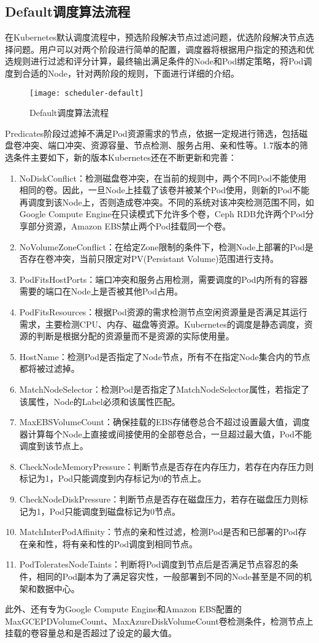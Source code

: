 \subsection{Default调度算法流程}
在Kubernetes默认调度流程中，预选阶段解决节点过滤问题，优选阶段解决节点选择问题。用户可以对两个阶段进行简单的配置，调度器将根据用户指定的预选和优选规则进行过滤和评分计算，最终输出满足条件的Node和Pod绑定策略，将Pod调度到合适的Node，针对两阶段的规则，下面进行详细的介绍。
\begin{figure}[H] %
	\centering
	\texttt{[image: scheduler-default]}
	\caption{Default调度算法流程}
\end{figure}
Predicates阶段过滤掉不满足Pod资源需求的节点，依据一定规进行筛选，包括磁盘卷冲突、端口冲突、资源容量、节点检测、服务占用、亲和性等。1.7版本的筛选条件主要如下，新的版本Kubernetes还在不断更新和完善：
\begin{enumerate}[(1)]
	\item NoDiskConflict：检测磁盘卷冲突，在当前的规则中，两个不同Pod不能使用相同的卷。因此，一旦Node上挂载了该卷并被某个Pod使用，则新的Pod不能再调度到该Node上，否则造成卷冲突。不同的系统对该冲突检测范围不同，如Google Compute Engine在只读模式下允许多个卷，Ceph RDB允许两个Pod分享部分资源，Amazon EBS禁止两个Pod挂载同一个卷。
	\item NoVolumeZoneConflict：在给定Zone限制的条件下，检测Node上部署的Pod是否存在卷冲突，当前只限定对PV(Persistant Volume)范围进行支持。
	\item PodFitsHostPorts：端口冲突和服务占用检测，需要调度的Pod内所有的容器需要的端口在Node上是否被其他Pod占用。
	\item PodFitsResources：根据Pod资源的需求检测节点空闲资源量是否满足其运行需求，主要检测CPU、内存、磁盘等资源。Kubernetes的调度是静态调度，资源的判断是根据分配的资源量而不是资源的实际使用量。
	\item HostName：检测Pod是否指定了Node节点，所有不在指定Node集合内的节点都将被过滤掉。
	\item MatchNodeSelector：检测Pod是否指定了MatchNodeSelector属性，若指定了该属性，Node的Label必须和该属性匹配。
	\item MaxEBSVolumeCount：确保挂载的EBS存储卷总合不超过设置最大值，调度器计算每个Node上直接或间接使用的全部卷总合，一旦超过最大值，Pod不能调度到该节点上。
	\item CheckNodeMemoryPressure：判断节点是否存在内存压力，若存在内存压力则标记为1，Pod只能调度到内存标记为0的节点上。
	\item CheckNodeDiskPressure：判断节点是否存在磁盘压力，若存在磁盘压力则标记为1，Pod只能调度到磁盘标记为0节点。
	\item MatchInterPodAffinity：节点的亲和性过滤，检测Pod是否和已部署的Pod存在亲和性，将有亲和性的Pod调度到相同节点。
	\item PodToleratesNodeTaints：判断将Pod调度到节点后是否满足节点容忍的条件，相同的Pod副本为了满足容灾性，一般部署到不同的Node甚至是不同的机架和数据中心。
\end{enumerate}
此外、还有专为Google Compute Engine和Amazon EBS配置的MaxGCEPDVolumeCount、MaxAzureDiskVolumeCount卷检测条件，检测节点上挂载的卷容量总和是否超过了设定的最大值。

